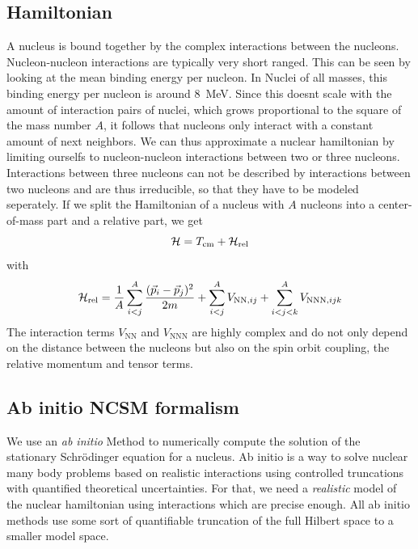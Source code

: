 \subsection{Hamiltonian}
A nucleus is bound together by the complex interactions between the nucleons. Nucleon-nucleon interactions are typically very short ranged. This can be seen by looking at the mean binding energy per nucleon. In Nuclei of all masses, this binding energy per nucleon is around \SI{8}{\mega\electronvolt}. Since this doesnt scale with the amount of interaction pairs of nuclei, which grows proportional to the square of the mass number $A$, it follows that nucleons only interact with a constant amount of next neighbors. We can thus approximate a nuclear hamiltonian by limiting ourselfs to nucleon-nucleon interactions between two or three nucleons. Interactions between three nucleons can not be described by interactions between two nucleons and are thus irreducible, so that they have to be modeled seperately. If we split the Hamiltonian of a nucleus with $A$ nucleons into a center-of-mass part and a relative part, we get
\begin{equation}
  \mathcal{H} = T_{\mathrm{cm}} + \mathcal{H}_{\mathrm{rel}}
\end{equation}
with
\begin{equation}
  \mathcal{H}_{\mathrm{rel}} = \frac{1}{A}\sum_{i<j}^A\frac{(\vec{p}_i - \vec{p}_j)^2}{2m} + \sum_{i<j}^A V_{\mathrm{NN}, ij} + \sum_{i<j<k}^AV_{\mathrm{NNN}, ijk}
\end{equation}
The interaction terms $V_\mathrm{NN}$ and $V_\mathrm{NNN}$ are highly complex and do not only depend on the distance between the nucleons but also on the spin orbit coupling, the relative momentum and tensor terms.
\subsection{Ab initio NCSM formalism}
We use an \textit{ab initio} Method to numerically compute the solution of the stationary Schrödinger equation for a nucleus. Ab initio is a way to solve nuclear many body problems based on realistic interactions using controlled truncations with quantified theoretical uncertainties. For that, we need a \textit{realistic} model of the nuclear hamiltonian using interactions which are precise enough. All ab initio methods use some sort of quantifiable truncation of the full Hilbert space to a smaller model space.

